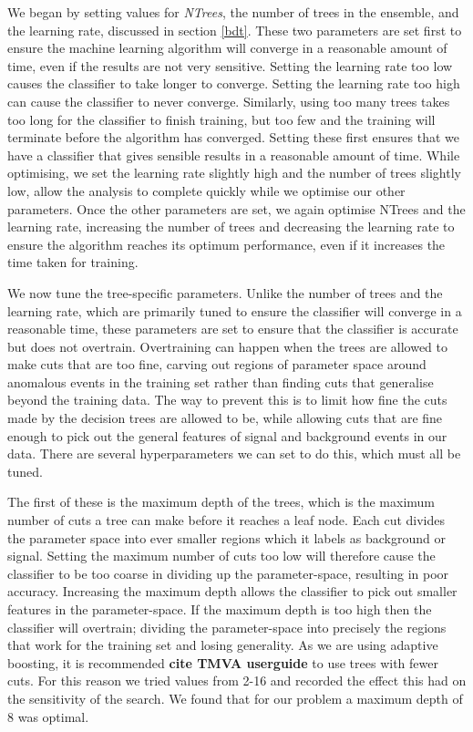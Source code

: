 \documentclass[11pt]{cuthesis}
\begin{document}
We began by setting values for \textit{NTrees}, the number of trees in the ensemble, and the learning rate, discussed in section \ref{bdt}. These two parameters are set first to ensure the machine learning algorithm will converge in a reasonable amount of time, even if the results are not very sensitive. Setting the learning rate too low causes the classifier to take longer to converge. Setting the learning rate too high can cause the classifier to never converge. Similarly, using too many trees takes too long for the classifier to finish training, but too few and the training will terminate before the algorithm has converged. Setting these first ensures that we have a classifier that gives sensible results in a reasonable amount of time. While optimising, we set the learning rate slightly high and the number of trees slightly low, allow the analysis to complete quickly while we optimise our other parameters. Once the other parameters are set, we again optimise NTrees and the learning rate, increasing the number of trees and decreasing the learning rate to ensure the algorithm reaches its optimum performance, even if it increases the time taken for training.

We now tune the tree-specific parameters. Unlike the number of trees and the learning rate, which are primarily tuned to ensure the classifier will converge in a reasonable time, these parameters are set to ensure that the classifier is accurate but does not overtrain. Overtraining can happen when the trees are allowed to make cuts that are too fine, carving out regions of parameter space around anomalous events in the training set rather than finding cuts that generalise beyond the training data. The way to prevent this is to limit how fine the cuts made by the decision trees are allowed to be, while allowing cuts that are fine enough to pick out the general features of signal and background events in our data. There are several hyperparameters we can set to do this, which must all be tuned. 

The first of these is the maximum depth of the trees, which is the maximum number of cuts a tree can make before it reaches a leaf node. Each cut divides the parameter space into ever smaller regions which it labels as background or signal. Setting the maximum number of cuts too low will therefore cause the classifier to be too coarse in dividing up the parameter-space, resulting in poor accuracy. Increasing the maximum depth allows the classifier to pick out smaller features in the parameter-space. If the maximum depth is too high then the classifier will overtrain; dividing the parameter-space into precisely the regions that work for the training set and losing generality. As we are using adaptive boosting, it is recommended \textbf{cite TMVA userguide} to use trees with fewer cuts. For this reason we tried values from 2-16 and recorded the effect this had on the sensitivity of the search. We found that for our problem a maximum depth of 8 was optimal. 
\end{document}
